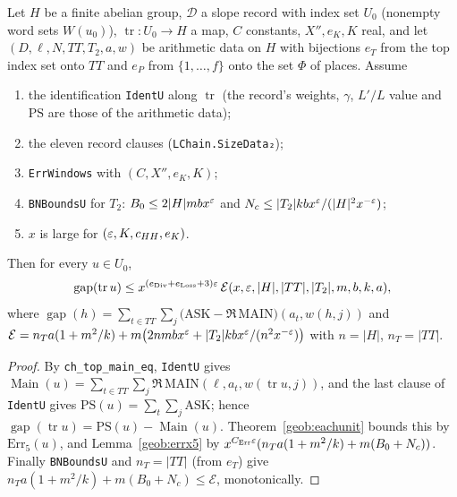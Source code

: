 \begin{theorem}\label{geob:chtop}
Let $H$ be a finite abelian group, $\mathcal D$ a slope record with index set
$U_0$ (nonempty word sets $W(u_0)$), $\operatorname{tr}\colon U_0\to H$ a map,
$C$ constants, $X'',e_K,K$ real, and let $(D,\ell,N,TT,T_2,a,w)$ be arithmetic
data on $H$ with bijections $e_T$ from the top index set onto $TT$ and $e_P$
from $\{1,\dots,f\}$ onto the set $\Phi$ of places. Assume
\begin{enumerate}
\item the identification \texttt{IdentU} along $\operatorname{tr}$ (the record's
weights, $\gamma$, $L'/L$ value and $\mathrm{PS}$ are those of the arithmetic
data);
\item the eleven record clauses (\texttt{LChain.SizeData₂});
\item \texttt{ErrWindows} with $(C,X'',e_K,K)$;
\item \texttt{BNBoundsU} for $T_2$:
$B_0\le2|H|mbx^{\varepsilon}$ and $N_c\le|T_2|kbx^{\varepsilon}/(|H|^2x^{-\varepsilon})$;
\item $x$ is large for $(\varepsilon,K,c_{HH},e_K)$.
\end{enumerate}
Then for every $u\in U_0$,
\[
\operatorname{gap}(\operatorname{tr}u)\le x^{(e_{\mathrm{Div}}+e_{\mathrm{Loss}}+3)\varepsilon}\,
\mathcal E(x,\varepsilon,|H|,|TT|,|T_2|,m,b,k,a),
\]
where $\operatorname{gap}(h)=\sum_{t\in TT}\sum_j\bigl(\mathrm{ASK}-\Re\,\mathrm{MAIN}\bigr)(a_t,w(h,j))$
and $\mathcal E=n_Ta(1+m^2/k)+m\bigl(2nmbx^{\varepsilon}+|T_2|kbx^{\varepsilon}/(n^2x^{-\varepsilon})\bigr)$
with $n=|H|$, $n_T=|TT|$.
\end{theorem}
\begin{proof}
By \texttt{ch\_top\_main\_eq}, \texttt{IdentU} gives
$\operatorname{Main}(u)=\sum_{t\in TT}\sum_j\Re\,\mathrm{MAIN}(\ell,a_t,w(\operatorname{tr}u,j))$,
and the last clause of \texttt{IdentU} gives $\mathrm{PS}(u)=\sum_t\sum_j\mathrm{ASK}$;
hence $\operatorname{gap}(\operatorname{tr}u)=\mathrm{PS}(u)-\operatorname{Main}(u)$.
Theorem~\ref{geob:eachunit} bounds this by $\mathrm{Err}_5(u)$, and
Lemma~\ref{geob:errx5} by $x^{C_{\mathrm{Err}}\varepsilon}(n_Ta(1+m^2/k)+m(B_0+N_c))$.
Finally \texttt{BNBoundsU} and $n_T=|TT|$ (from $e_T$) give
$n_Ta(1+m^2/k)+m(B_0+N_c)\le\mathcal E$, monotonically.
\end{proof}

